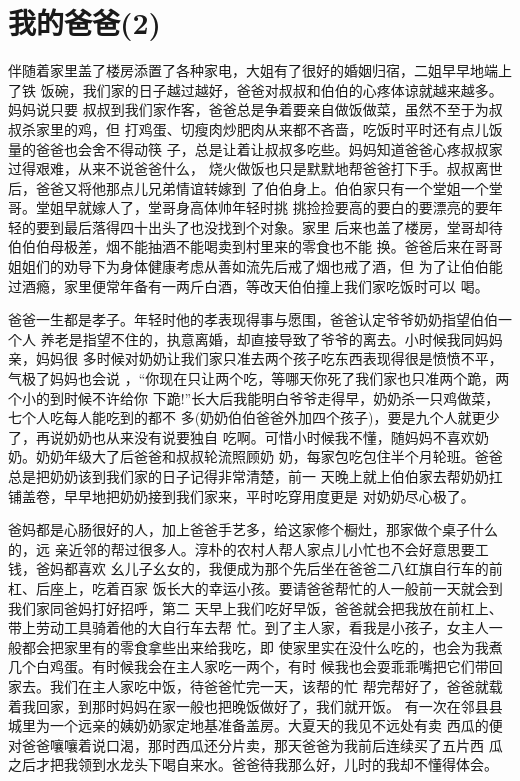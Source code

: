 \documentclass[12pt]{book}
\begin{document}
\section{我的爸爸(2)}
\label{sec-9-42}

伴随着家里盖了楼房添置了各种家电，大姐有了很好的婚姻归宿，二姐早早地端上了铁
饭碗，我们家的日子越过越好，爸爸对叔叔和伯伯的心疼体谅就越来越多。妈妈说只要
叔叔到我们家作客，爸爸总是争着要亲自做饭做菜，虽然不至于为叔叔杀家里的鸡，但
打鸡蛋、切瘦肉炒肥肉从来都不吝啬，吃饭时平时还有点儿饭量的爸爸也会舍不得动筷
子，总是让着让叔叔多吃些。妈妈知道爸爸心疼叔叔家过得艰难，从来不说爸爸什么，
烧火做饭也只是默默地帮爸爸打下手。叔叔离世后，爸爸又将他那点儿兄弟情谊转嫁到
了伯伯身上。伯伯家只有一个堂姐一个堂哥。堂姐早就嫁人了，堂哥身高体帅年轻时挑
挑捡捡要高的要白的要漂亮的要年轻的要到最后落得四十出头了也没找到个对象。家里
后来也盖了楼房，堂哥却待伯伯伯母极差，烟不能抽酒不能喝卖到村里来的零食也不能
换。爸爸后来在哥哥姐姐们的劝导下为身体健康考虑从善如流先后戒了烟也戒了酒，但
为了让伯伯能过酒瘾，家里便常年备有一两斤白酒，等改天伯伯撞上我们家吃饭时可以
喝。

爸爸一生都是孝子。年轻时他的孝表现得事与愿围，爸爸认定爷爷奶奶指望伯伯一个人
养老是指望不住的，执意离婚，却直接导致了爷爷的离去。小时候我同妈妈亲，妈妈很
多时候对奶奶让我们家只准去两个孩子吃东西表现得很是愤愤不平，气极了妈妈也会说
，“你现在只让两个吃，等哪天你死了我们家也只准两个跪，两个小的到时候不许给你
下跪!”长大后我能明白爷爷走得早，奶奶杀一只鸡做菜，七个人吃每人能吃到的都不
多(奶奶伯伯爸爸外加四个孩子)，要是九个人就更少了，再说奶奶也从来没有说要独自
吃啊。可惜小时候我不懂，随妈妈不喜欢奶奶。奶奶年级大了后爸爸和叔叔轮流照顾奶
奶，每家包吃包住半个月轮班。爸爸总是把奶奶该到我们家的日子记得非常清楚，前一
天晚上就上伯伯家去帮奶奶扛铺盖卷，早早地把奶奶接到我们家来，平时吃穿用度更是
对奶奶尽心极了。

爸妈都是心肠很好的人，加上爸爸手艺多，给这家修个橱灶，那家做个桌子什么的，远
亲近邻的帮过很多人。淳朴的农村人帮人家点儿小忙也不会好意思要工钱，爸妈都喜欢
幺儿子幺女的，我便成为那个先后坐在爸爸二八红旗自行车的前杠、后座上，吃着百家
饭长大的幸运小孩。要请爸爸帮忙的人一般前一天就会到我们家同爸妈打好招呼，第二
天早上我们吃好早饭，爸爸就会把我放在前杠上、带上劳动工具骑着他的大自行车去帮
忙。到了主人家，看我是小孩子，女主人一般都会把家里有的零食拿些出来给我吃，即
使家里实在没什么吃的，也会为我煮几个白鸡蛋。有时候我会在主人家吃一两个，有时
候我也会耍乖乖嘴把它们带回家去。我们在主人家吃中饭，待爸爸忙完一天，该帮的忙
帮完帮好了，爸爸就载着我回家，到那时妈妈在家一般也把晚饭做好了，我们就开饭。
有一次在邻县县城里为一个远亲的姨奶奶家定地基准备盖房。大夏天的我见不远处有卖
西瓜的便对爸爸嚷嚷着说口渴，那时西瓜还分片卖，那天爸爸为我前后连续买了五片西
瓜之后才把我领到水龙头下喝自来水。爸爸待我那么好，儿时的我却不懂得体会。
\end{document}
